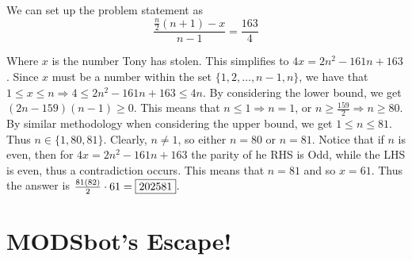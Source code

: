 \documentclass[titlepage=true]{scrartcl}
\def\Paiya{AiYa\#2278 (675537018868072458)}
\begin{document}
    \begin{solution}\hfil\medskip 
   
        We can set up the problem statement as 
        \begin{equation*}
            \frac{\frac{n}{2}(n+1)-x}{n-1}=\frac{163}{4}
        \end{equation*}
                
         Where \(x\) is the number Tony has stolen.
	 This simplifies to \(4x=2n^2-161n+163\).
	 Since \(x\) must be a number within the set \(\{1,2,\ldots,n-1,n\}\), we have that \(1\leq x\leq n\Rightarrow 4\leq 2n^2-161n+163\leq4n\).
	 By considering the lower bound, we get $(2n-159)(n-1)\geq 0$.
	 This means that \(n\leq 1\Rightarrow n=1\), or \(n\geq \frac{159}{2}\Rightarrow n\geq 80\).
	 By similar methodology when considering the upper bound, we get \(1\leq n\leq 81\).
	 Thus \(n\in\{1,80,81\}\).
	 Clearly, \(n\ne 1\), so either \(n=80\) or \(n=81\).
	 Notice that if \(n\) is even, then for \(4x=2n^2-161n+163\) the parity of he RHS is Odd, while the LHS is even, thus a contradiction occurs.
	 This means that \(n=81\) and so \(x=61\). Thus the answer is \(\frac{81(82)}{2}\cdot61=\fbox{202581}\).
    \end{solution}\bigskip

%        
%        
%
%

\newpage

\section{MODSbot's Escape!}
\end{document}
